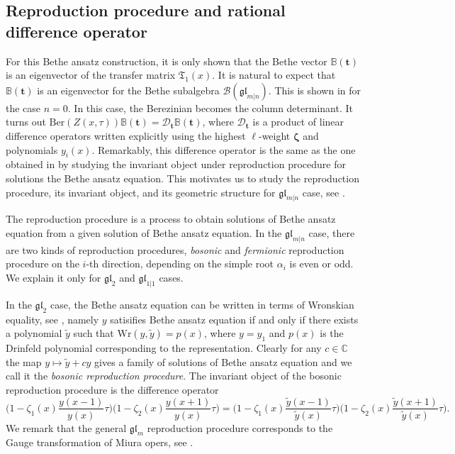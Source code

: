 \documentclass[11pt,reqno]{amsart}
\numberwithin{equation}{section}
\theoremstyle{definition}
\theoremstyle{remark}
\newcommand{\C}{\mathbb{C}}
\newcommand{\mc}{\mathcal}
\newcommand{\gl}{\mathfrak{gl}}
\newcommand{\fkT}{\mathfrak{T}}
\newcommand{\Wr}{\mathrm{Wr}}
\newcommand{\tl}{\tilde}
\newcommand{\glMN}{\mathfrak{gl}_{m|n}}
\begin{document}
\subsection{Reproduction procedure and rational difference operator}\label{sec repro}
For this Bethe ansatz construction, it is only shown that the Bethe vector $\mathbb B(\bm t)$ is an eigenvector of the transfer matrix $\fkT_1(x)$. It is natural to expect that $\mathbb B(\bm t)$ is an eigenvector for the Bethe subalgebra $\mc B(\glMN)$. This is shown in \cite{MTV:2006} for the case $n=0$. In this case, the Berezinian becomes the column determinant. It turns out $\mathrm{Ber}(Z(x,\tau))\mathbb B(\bm t)=\mc D_{\bm t}\mathbb B(\bm t)$, where $\mc D_{\bm t}$ is a product of linear difference operators written explicitly using the highest $\ell$-weight $\bm \zeta$ and polynomials $y_i(x)$. Remarkably, this difference operator is the same as the one obtained in \cite{MV:2003} by studying the invariant object under reproduction procedure for solutions the Bethe ansatz equation. This motivates us to study the reproduction procedure, its invariant object, and its geometric structure for $\glMN$ case, see \cite{HLM:2019}. 

The reproduction procedure is a process to obtain solutions of Bethe ansatz equation from a given solution of Bethe ansatz equation. In the $\glMN$ case, there are two kinds of reproduction procedures, \textit{bosonic} and \textit{fermionic} reproduction procedure on the $i$-th direction, depending on the simple root $\alpha_i$ is even or odd. We explain it only for $\gl_2$ and $\gl_{1|1}$ cases.

In the $\gl_2$ case, the Bethe ansatz equation can be written in terms of Wronskian equality, see \cite{MV:2003,MV:2005}, namely $y$ satisifies Bethe ansatz equation if and only if there exists a polynomial $\tl y$ such that $\Wr(y,\tl y)=p(x)$, where $y=y_1$ and $p(x)$ is the Drinfeld polynomial corresponding to the representation. Clearly for any $c\in\C$ the map $y\mapsto \tl y+cy$ gives a family of solutions of Bethe ansatz equation and we call it the \textit{bosonic reproduction procedure}. The invariant object of the bosonic reproduction procedure is the difference operator $$\Big(1-\zeta_1(x)\frac{y(x-1)}{y(x)}\tau\Big)\Big(1-\zeta_2(x)\frac{y(x+1)}{y(x)}\tau\Big)=\Big(1-\zeta_1(x)\frac{\tl y(x-1)}{\tl y(x)}\tau\Big)\Big(1-\zeta_2(x)\frac{\tl y(x+1)}{\tl y(x)}\tau\Big).$$
We remark that the general $\gl_m$ reproduction procedure corresponds to the Gauge transformation of Miura opers, see \cite{F:2004,MV:2005miura}.
\end{document}
